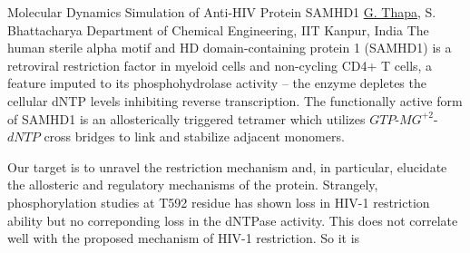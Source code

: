
    \begin{abstract_online}{Molecular Dynamics Simulation of Anti-HIV Protein SAMHD1 }{%
        \underline{G. Thapa}, S. Bhattacharya}{%
        }{%
        Department of Chemical Engineering, IIT Kanpur, India}
    The human sterile alpha motif and HD domain-containing protein 1 (SAMHD1)  is a retroviral restriction factor in myeloid cells and non-cycling CD4+ T  cells, a feature imputed to its phosphohydrolase activity – the enzyme  depletes the cellular dNTP levels inhibiting reverse transcription. The  functionally active form of SAMHD1 is an allosterically triggered tetramer  which utilizes $GTP$-$MG^{+2}$-$dNTP$ cross bridges to link and stabilize adjacent monomers. \par  Our target is to unravel the restriction mechanism and, in particular,  elucidate the allosteric and regulatory mechanisms of the protein. Strangely, phosphorylation studies at T592 residue has shown loss in HIV-1  restriction ability but no correponding loss in the dNTPase activity. This  does not correlate well with the proposed mechanism of HIV-1 restriction.  So it is 
\end{abstract_online}
